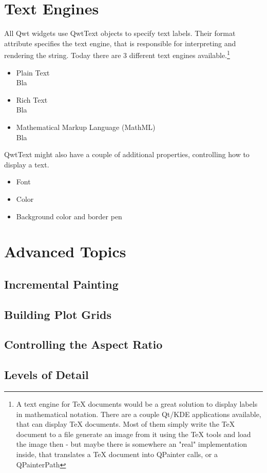 \documentclass[12pt,a4paper]{book}
\begin{document}
\chapter{Text Engines}

All Qwt widgets use QwtText objects to specify text labels. Their format attribute specifies the text engine, that is responsible for interpreting and rendering the string. Today there are 3 different text engines available.\footnote{A text engine for TeX documents would be a great solution to display labels in mathematical notation. There are a couple Qt/KDE applications available, that can display TeX documents. Most of them simply write the TeX document to a file generate an image from it using the TeX tools and load the image then - but maybe there is somewhere an "real" implementation inside, that translates a TeX document into QPainter calls, or a QPainterPath }

\begin{itemize}

\item Plain Text\\
Bla

\item Rich Text\\
Bla

\item Mathematical Markup Language (MathML)\\
Bla

\end{itemize}

QwtText might also have a couple of additional properties, controlling how to display a text.

\begin{itemize}
\item Font
\item Color
\item Background color and border pen
\end{itemize}


\chapter{Advanced Topics}

\section{Incremental Painting}

\section{Building Plot Grids}

\section{Controlling the Aspect Ratio}

\section{Levels of Detail}
\end{document}
